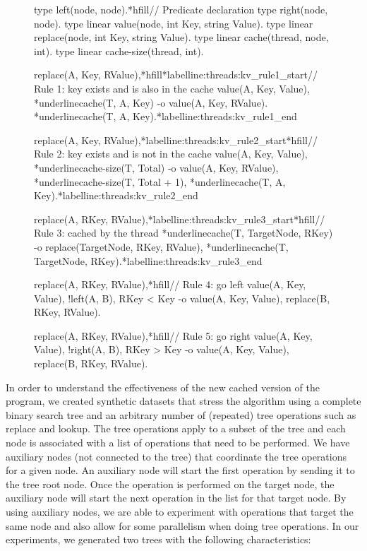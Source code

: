 \begin{figure}[ht]
\begin{LineCode}[commandchars=*\{\}]
type left(node, node).*hfill// Predicate declaration
type right(node, node).
type linear value(node, int Key, string Value).
type linear replace(node, int Key, string Value).
type linear cache(thread, node, int).
type linear cache-size(thread, int).

replace(A, Key, RValue),*hfill*label{line:threads:kv_rule1_start}// Rule 1: key exists and is also in the cache
value(A, Key, Value),
*underline{cache(T, A, Key)}
   -o value(A, Key, RValue).
      *underline{cache(T, A, Key)}.*label{line:threads:kv_rule1_end}

replace(A, Key, RValue),*label{line:threads:kv_rule2_start}*hfill// Rule 2: key exists and is not in the cache
value(A, Key, Value),
*underline{cache-size(T, Total)}
   -o value(A, Key, RValue),
      *underline{cache-size(T, Total + 1)},
      *underline{cache(T, A, Key)}.*label{line:threads:kv_rule2_end}

replace(A, RKey, RValue),*label{line:threads:kv_rule3_start}*hfill// Rule 3: cached by the thread
*underline{cache(T, TargetNode, RKey)}
   -o replace(TargetNode, RKey, RValue),
      *underline{cache(T, TargetNode, RKey)}.*label{line:threads:kv_rule3_end}

replace(A, RKey, RValue),*hfill// Rule 4: go left
value(A, Key, Value),
!left(A, B),
RKey < Key
   -o value(A, Key, Value),
      replace(B, RKey, RValue).

replace(A, RKey, RValue),*hfill// Rule 5: go right
value(A, Key, Value),
!right(A, B),
RKey > Key
   -o value(A, Key, Value),
      replace(B, RKey, RValue).
\end{LineCode}
\label{code:threads:btree_lookup_cache}
\end{figure}

In order to understand the effectiveness of the new cached version of the
program, we created synthetic datasets that stress the algorithm using a
complete binary search tree and an arbitrary number of (repeated) tree
operations such as replace and lookup. The tree operations apply to a subset of
the tree and each node is associated with a list of operations that need to be
performed. We have auxiliary nodes (not connected to the tree) that coordinate
the tree operations for a given node. An auxiliary node will start the first
operation by sending it to the tree root node. Once the operation is performed
on the target node, the auxiliary node will start the next operation in the list
for that target node. By using auxiliary nodes, we are able to experiment with
operations that target the same node and also allow for some parallelism when
doing tree operations. In our experiments, we generated two trees with the
following characteristics:

